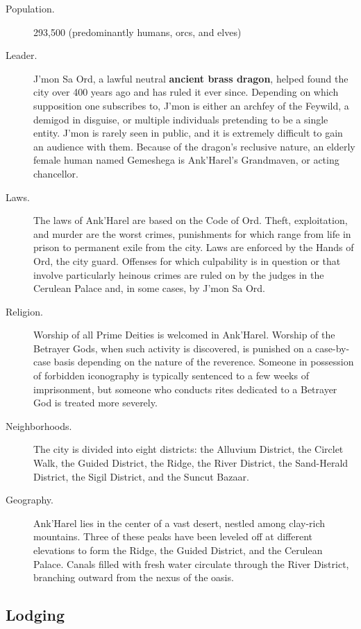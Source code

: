 \documentclass[a4paper, 11pt, bg=full, twocolumn, nooutline]{dndbook}
\begin{document}
\begin{description}
\item[Population.] 293,500 (predominantly humans, orcs, and elves)
\item[Leader.] J'mon Sa Ord, a lawful neutral \textbf{ancient brass dragon}, helped found the city over 400 years ago and has ruled it ever since. Depending on which supposition one subscribes to, J'mon is either an archfey of the Feywild, a demigod in disguise, or multiple individuals pretending to be a single entity. J'mon is rarely seen in public, and it is extremely difficult to gain an audience with them. Because of the dragon's reclusive nature, an elderly female human named Gemeshega is Ank'Harel's Grandmaven, or acting chancellor.
\item[Laws.] The laws of Ank'Harel are based on the Code of Ord. Theft, exploitation, and murder are the worst crimes, punishments for which range from life in prison to permanent exile from the city. Laws are enforced by the Hands of Ord, the city guard. Offenses for which culpability is in question or that involve particularly heinous crimes are ruled on by the judges in the Cerulean Palace and, in some cases, by J'mon Sa Ord.
\item[Religion.] Worship of all Prime Deities is welcomed in Ank'Harel. Worship of the Betrayer Gods, when such activity is discovered, is punished on a case-by-case basis depending on the nature of the reverence. Someone in possession of forbidden iconography is typically sentenced to a few weeks of imprisonment, but someone who conducts rites dedicated to a Betrayer God is treated more severely.
\item[Neighborhoods.] The city is divided into eight districts: the Alluvium District, the Circlet Walk, the Guided District, the Ridge, the River District, the Sand-Herald District, the Sigil District, and the Suncut Bazaar.
\item[Geography.] Ank'Harel lies in the center of a vast desert, nestled among clay-rich mountains. Three of these peaks have been leveled off at different elevations to form the Ridge, the Guided District, and the Cerulean Palace. Canals filled with fresh water circulate through the River District, branching outward from the nexus of the oasis.
\end{description}



\subsection{Lodging}
\end{document}

